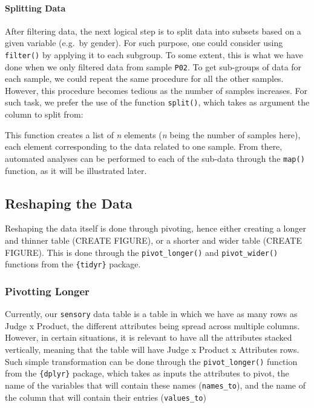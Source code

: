 \documentclass[
]{book}
\newenvironment{Shaded}{\begin{snugshade}}{\end{snugshade}}
\newcommand{\FunctionTok}[1]{\textcolor[rgb]{0.00,0.00,0.00}{#1}}
\newcommand{\NormalTok}[1]{#1}
\newcommand{\SpecialCharTok}[1]{\textcolor[rgb]{0.00,0.00,0.00}{#1}}
\begin{document}
\hypertarget{splitting-data}{%
\paragraph{Splitting Data}\label{splitting-data}}

After filtering data, the next logical step is to split data into subsets based on a given variable (e.g.~by gender). For such purpose, one could consider using \texttt{filter()} by applying it to each subgroup. To some extent, this is what we have done when we only filtered data from sample \texttt{P02}. To get sub-groups of data for each sample, we could repeat the same procedure for all the other samples. However, this procedure becomes tedious as the number of samples increases.
For such task, we prefer the use of the function \texttt{split()}, which takes as argument the column to split from:

\begin{Shaded}
\end{Shaded}

This function creates a list of \emph{n} elements (\emph{n} being the number of samples here), each element corresponding to the data related to one sample.
From there, automated analyses can be performed to each of the sub-data through the \texttt{map()} function, as it will be illustrated later.

\hypertarget{reshaping-the-data}{%
\subsection{Reshaping the Data}\label{reshaping-the-data}}

Reshaping the data itself is done through pivoting, hence either creating a longer and thinner table (CREATE FIGURE), or a shorter and wider table (CREATE FIGURE). This is done through the \texttt{pivot\_longer()} and \texttt{pivot\_wider()} functions from the \texttt{\{tidyr\}} package.

\hypertarget{pivotting-longer}{%
\subsubsection{Pivotting Longer}\label{pivotting-longer}}

Currently, our \texttt{sensory} data table is a table in which we have as many rows as Judge x Product, the different attributes being spread across multiple columns. However, in certain situations, it is relevant to have all the attributes stacked vertically, meaning that the table will have Judge x Product x Attributes rows. Such simple transformation can be done through the \texttt{pivot\_longer()} function from the \texttt{\{dplyr\}} package, which takes as inputs the attributes to pivot, the name of the variables that will contain these names (\texttt{names\_to}), and the name of the column that will contain their entries (\texttt{values\_to})
\end{document}
